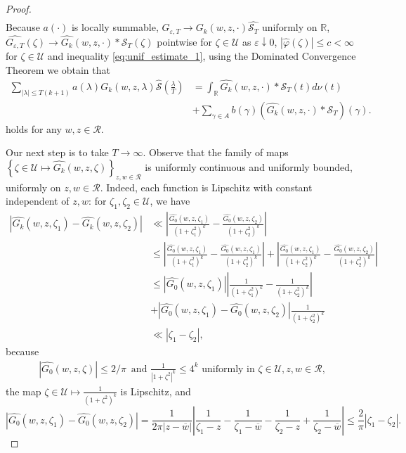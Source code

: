\documentclass[10pt,a4paper]{amsart}
\newcommand{\R}{\mathcal{R}}
\renewcommand{\S}{\mathcal{S}}
\newcommand{\U}{\mathcal{U}}
\newcommand{\cd}{\cdot}
\newcommand{\ep}{\varepsilon}
\newcommand{\ft}{\widehat}
\newcommand{\ga}{\gamma}
\newcommand{\la}{\lambda}
\newcommand{\mt}{\mapsto}
\newcommand{\ov}[1]{\overline{#1}}
\newcommand{\p}{\varphi}
\renewcommand{\r}{\mathbb{R}}
\newcommand{\ra}{\rightarrow}
\newcommand{\w}{\ov{w}}
\begin{document}
\begin{proof}
\begin{align}
\end{align}
Because $a(\cd)$ is locally summable, $G_{\ep,T}\ra G_k(w,z,\cd)\ft{\S_T}$ uniformly on $\r$, $\ft{G_{\ep,T}}(\zeta)\ra\ft{G_k}(w,z,\cd)* \S_T(\zeta)$ pointwise for $\zeta\in\U$ as $\ep\downarrow0$, $|\ft{\p}(\zeta)|\leq c<\infty$ for $\zeta\in\U$ and inequality \eqref{eq:unif_estimate_1}, using the Dominated Convergence Theorem we obtain that
\begin{align}
\label{eq:intermediate_bridge}
\sum_{|\la|\leq T(k+1)} a(\la)G_k(w,z,\la)\ft{\S}\left(\frac{\la}{T}\right)&=\int_{\r} \ft{G_k}(w,z,\cd)*\S_T(t)d\nu(t)\\
&+\sum_{\ga\in A} b(\ga)\left(\ft{G_k}(w,z,\cd)* \S_T\right)(\ga).
\end{align}
holds for any $w,z\in\R$.

Our next step is to take $T\ra\infty$. Observe that the family of maps $\left\{\zeta\in\U\mt\ft{G_k}(w,z,\zeta)\right\}_{z,w\in \R}$ is uniformly continuous and uniformly bounded, uniformly on $z,w\in\R$. Indeed, each function is Lipschitz with constant independent of $z,w$: for $\zeta_1,\zeta_2\in\U$, we have
\begin{align*}
\left|\ft{G_k}(w,z,\zeta_1)-\ft{G_k}(w,z,\zeta_2)\right|&\ll\left|\frac{\ft{G_0}(w,z,\zeta_1)}{(1+\zeta_1^2)^k}-\frac{\ft{G_0}(w,z,\zeta_2)}{(1+\zeta_2^2)^k}\right|\\
&\leq\left|\frac{\ft{G_0}(w,z,\zeta_1)}{(1+\zeta_1^2)^k}-\frac{\ft{G_0}(w,z,\zeta_1)}{(1+\zeta_2^2)^k}\right|+\left|\frac{\ft{G_0}(w,z,\zeta_1)}{(1+\zeta_2^2)^k}-\frac{\ft{G_0}(w,z,\zeta_2)}{(1+\zeta_2^2)^k}\right|\\
&\leq\left|\ft{G_0}(w,z,\zeta_1)\right|\left|\frac{1}{(1+\zeta_1^2)^k}-\frac{1}{(1+\zeta_2^2)^k}\right|\\
&+\left|\ft{G_0}(w,z,\zeta_1)-\ft{G_0}(w,z,\zeta_2)\right|\frac{1}{(1+\zeta_2^2)^k}\\
&\ll |\zeta_1-\zeta_2|,
\end{align*}
because
\begin{align*}
    \left|\ft{G_0}(w,z,\zeta)\right|\leq 2/\pi\, \text{ and } \frac{1}{\left|1+\zeta^2\right|^k}\leq 4^k \text{ uniformly in } \zeta\in\U,z,w\in\R,
\end{align*}
the map $\zeta\in\U\mt\frac{1}{(1+\zeta^2)^k}$ is Lipschitz, and 
\begin{equation}
|\ft{G_0}(w,z,\zeta_1)-\ft{G_0}(w,z,\zeta_2)|=\frac{1}{2\pi|z-\w|}\left|\frac{1}{\zeta_1-z}-\frac{1}{\zeta_1-\w}-\frac{1}{\zeta_2-z}+\frac{1}{\zeta_2-\w}\right|\leq\frac{2}{\pi}\left|\zeta_1-\zeta_2\right|.

\end{equation}
\end{proof}
\end{document}

